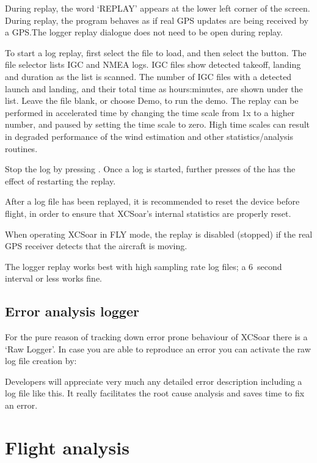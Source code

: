 During replay, the word `REPLAY' appears at the lower left corner of
the screen.  During replay, the program behaves as if real GPS updates
are being received by a GPS.\@  The logger replay dialogue does not need
to be open during replay.

To start a log replay, first select the file to load, and then select the
 button.  The file selector lists IGC and NMEA logs.  IGC
files show detected takeoff, landing and duration as the list is scanned.
The number of IGC files with a detected launch and landing, and their
total time as hours:minutes, are shown under the list.
Leave the file blank, or choose Demo, to run the demo.  The replay can be
performed in accelerated time
by changing the time scale from 1x to a higher number, and paused by
setting the time scale to zero.  High time scales can result in degraded
performance of the wind estimation and other statistics/analysis routines.

Stop the log by pressing .
Once a log is started, further presses of the  has the
effect of restarting the replay.

\tip{} After a log file has been replayed, it is recommended to reset
the device before flight, in order to ensure that XCSoar's internal
statistics are properly reset.

When operating XCSoar in FLY mode, the replay is disabled (stopped) if
the real GPS receiver detects that the aircraft is moving.

The logger replay works best with high sampling rate log files;
a 6~second interval or less works fine.

\subsection*{Error analysis logger}\label{sec:raw-logger}
For the pure reason of tracking down error prone behaviour of XCSoar
there is a `Raw Logger'. In case you are able to reproduce an error you can
activate the raw log file creation by:
\begin{quote}
\blink{}
\end{quote}
Developers will appreciate very much any detailed error description including a log file like this. It really facilitates the root cause analysis and saves time to fix an error.

\section{Flight analysis}\label{sec:analysis-climb}

